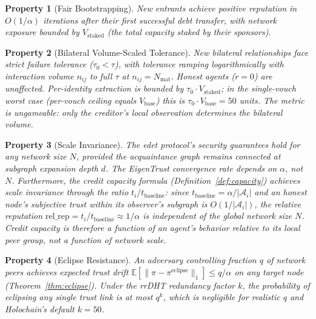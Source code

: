 \documentclass[11pt]{article}
\newtheorem{property}{Property}[section]
\begin{document}
\begin{property}[Fair Bootstrapping]
New entrants achieve positive reputation in $O(1/\alpha)$ iterations after their first successful debt transfer, with network exposure bounded by $V_{\text{staked}}$ (the total capacity staked by their sponsors).
\end{property}

\begin{property}[Bilateral Volume-Scaled Tolerance]
New bilateral relationships face strict failure tolerance ($\tau_0 < \tau$), with tolerance ramping logarithmically with interaction volume $n_{ij}$ to full $\tau$ at $n_{ij} = N_{\text{mat}}$. Honest agents ($r = 0$) are unaffected. Per-identity extraction is bounded by $\tau_0 \cdot V_{\text{staked}}$; in the single-vouch worst case (per-vouch ceiling equals $V_{\text{base}}$) this is $\tau_0 \cdot V_{\text{base}} = 50$ units. The metric is ungameable: only the creditor's local observation determines the bilateral volume.
\end{property}

\begin{property}[Scale Invariance]
The \em edet \em protocol's security guarantees hold for any network size $N$, provided the acquaintance graph remains connected at subgraph expansion depth $d$. The EigenTrust convergence rate depends on $\alpha$, not $N$. Furthermore, the credit capacity formula (Definition~\ref{def:capacity}) achieves scale invariance through the ratio $t_i / t_{\text{baseline}}$: since $t_{\text{baseline}} = \alpha / |\mathcal{A}_i|$ and an honest node's subjective trust within its observer's subgraph is $O(1/|\mathcal{A}_i|)$, the relative reputation $\text{rel\_rep} = t_i / t_{\text{baseline}} \approx 1/\alpha$ is \emph{independent} of the global network size $N$. Credit capacity is therefore a function of an agent's behavior relative to its local peer group, not a function of network scale.
\end{property}

\begin{property}[Eclipse Resistance]
An adversary controlling fraction $q$ of network peers achieves expected trust drift $\mathbb{E}[\|\pi - \pi^{\text{eclipse}}\|_1] \leq q/\alpha$ on any target node (Theorem~\ref{thm:eclipse}). Under the rrDHT redundancy factor $k$, the probability of eclipsing any single trust link is at most $q^k$, which is negligible for realistic $q$ and Holochain's default $k = 50$.
\end{property}
\end{document}
